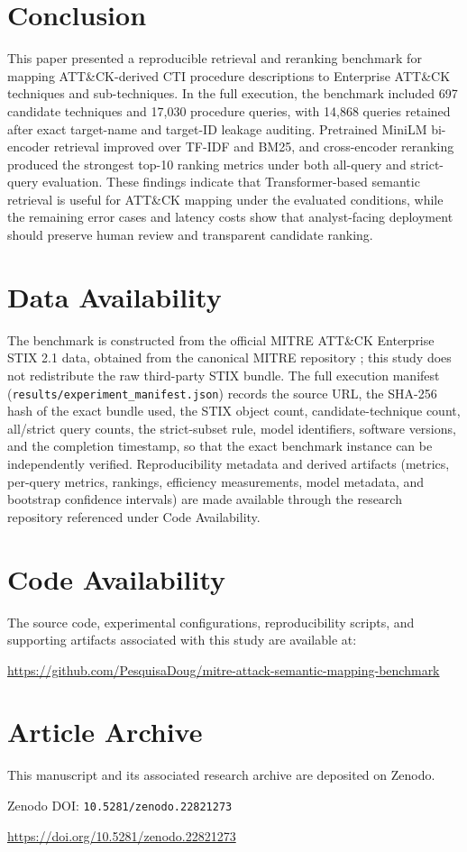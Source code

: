 \documentclass[conference]{IEEEtran}
\begin{document}
\section{Conclusion}
This paper presented a reproducible retrieval and reranking benchmark for mapping ATT\&CK-derived CTI procedure descriptions to Enterprise ATT\&CK techniques and sub-techniques. In the full execution, the benchmark included 697 candidate techniques and 17,030 procedure queries, with 14,868 queries retained after exact target-name and target-ID leakage auditing. Pretrained MiniLM bi-encoder retrieval improved over TF-IDF and BM25, and cross-encoder reranking produced the strongest top-10 ranking metrics under both all-query and strict-query evaluation. These findings indicate that Transformer-based semantic retrieval is useful for ATT\&CK mapping under the evaluated conditions, while the remaining error cases and latency costs show that analyst-facing deployment should preserve human review and transparent candidate ranking.

\section*{Data Availability}
The benchmark is constructed from the official MITRE ATT\&CK Enterprise STIX 2.1 data, obtained from the canonical MITRE repository \cite{mitre_attack_stix_data}; this study does not redistribute the raw third-party STIX bundle. The full execution manifest (\texttt{results/experiment\_manifest.json}) records the source URL, the SHA-256 hash of the exact bundle used, the STIX object count, candidate-technique count, all/strict query counts, the strict-subset rule, model identifiers, software versions, and the completion timestamp, so that the exact benchmark instance can be independently verified. Reproducibility metadata and derived artifacts (metrics, per-query metrics, rankings, efficiency measurements, model metadata, and bootstrap confidence intervals) are made available through the research repository referenced under Code Availability.

\section*{Code Availability}
The source code, experimental configurations, reproducibility scripts, and supporting artifacts associated with this study are available at:

\url{https://github.com/PesquisaDoug/mitre-attack-semantic-mapping-benchmark}

\section*{Article Archive}
This manuscript and its associated research archive are deposited on Zenodo.

\noindent Zenodo DOI: \verb|10.5281/zenodo.22821273|

\noindent \url{https://doi.org/10.5281/zenodo.22821273}



\end{document}

